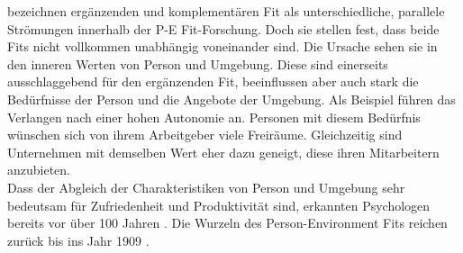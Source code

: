 \textcite[S. 1ff.]{edwards:2004} bezeichnen ergänzenden und komplementären Fit als unterschiedliche, parallele Strömungen innerhalb der P-E Fit-Forschung. Doch sie stellen fest, dass beide Fits nicht vollkommen unabhängig voneinander sind. Die Ursache sehen sie in den inneren Werten von Person und Umgebung. Diese sind einerseits ausschlaggebend für den ergänzenden Fit, beeinflussen aber auch stark die Bedürfnisse der Person und die Angebote der Umgebung. Als Beispiel führen \textcite[S. 3]{edwards:2004} das Verlangen nach einer hohen Autonomie an. Personen mit diesem Bedürfnis wünschen sich von ihrem Arbeitgeber viele Freiräume. Gleichzeitig sind Unternehmen mit demselben Wert eher dazu geneigt, diese ihren Mitarbeitern anzubieten.\\
Dass der Abgleich der Charakteristiken von Person und Umgebung sehr bedeutsam für Zufriedenheit und Produktivität sind, erkannten Psychologen bereits vor über 100 Jahren \cite[S. 5ff.]{parsons:1909}. Die Wurzeln des Person-Environment Fits reichen zurück bis ins Jahr 1909 \cite[S. 1]{su:2015}.

